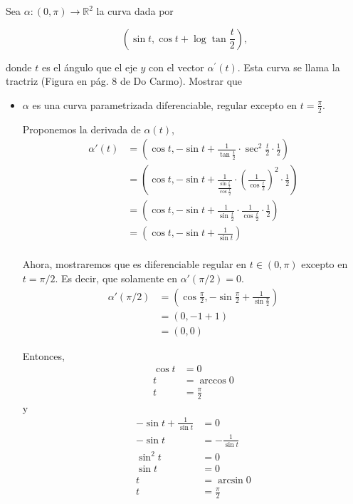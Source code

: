 \begin{problema}
 Sea $\alpha:(0, \pi) \rightarrow \mathbb{R}^{2}$ la curva dada por

$$
\left(\sin t, \cos t+\log \tan \frac{t}{2}\right),
$$

donde $t$ es el ángulo que el eje $y$ con el vector $\alpha^{\prime}(t)$. Esta curva se llama la tractriz (Figura en pág. 8 de Do Carmo). Mostrar que

\begin{itemize}
    \item $\alpha$ es una curva parametrizada diferenciable, regular excepto en $t=\frac{\pi}{2}$.
    \begin{sol}
        Proponemos la derivada de $\alpha(t)$,
        \begin{align*}
            \alpha'(t)&=\left(\cos t, -\sin t +\frac{1}{\tan \frac{t}{2}}\cdot \sec^2 \frac{t}{2}\cdot \frac{1}{2}\right)\\
            &= \left(\cos t, -\sin t +\frac{1}{\frac{\sin \frac{t}{2} }{\cos \frac{t}{2}}}\cdot \left(\frac{1}{\cos \frac{t}{2}}\right)^2 \cdot \frac{1}{2}\right)\\
            &= \left(\cos t, -\sin t +\frac{1}{\sin \frac{t}{2} }\cdot \frac{1}{\cos \frac{t}{2}} \cdot \frac{1}{2}\right)\\
            &= \left(\cos t, -\sin t +\frac{1}{\sin t}\right)\\
        \end{align*}

        Ahora, mostraremos que es diferenciable regular en $t\in (0,\pi)$ excepto en $t=\pi/2$. Es decir, que solamente en  $\alpha'(\pi/2)=0$.
        \begin{align*}
            \alpha'(\pi/2)&= \left(\cos \frac{\pi}{2}, -\sin \frac{\pi}{2} +\frac{1}{\sin \frac{\pi}{2}}\right)\\
            &= \left(0, -1 +1\right)\\
            &= \left(0, 0\right)
        \end{align*}

        Entonces,
        \begin{align*}
            \cos t &= 0\\
            t &= \arccos 0\\
            t &= \frac{\pi}{2}
        \end{align*}
        y 
        \begin{align*}
            -\sin t +\frac{1}{\sin t}&=0\\
            -\sin t &=-\frac{1}{\sin t}\\
            \sin^2 t &= 0\\
            \sin t & = 0\\
            t &= \arcsin 0\\
            t &= \frac{\pi}{2}
        \end{align*}


\end{sol}
\end{itemize}
\end{problema}
